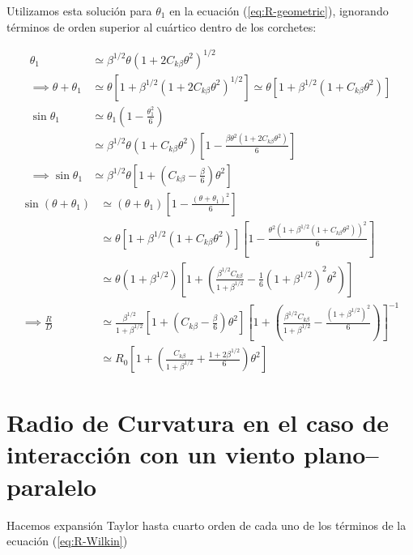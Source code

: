Utilizamos esta solución para $\theta_1$ en la ecuación (\ref{eq:R-geometric}), ignorando términos de orden superior al cuártico
dentro de los corchetes:

\begin{align}
  \theta_1 &\simeq \beta^{1/2}\theta\left(1 + 2C_{k\beta}\theta^2\right)^{1/2} \\
  \implies \theta + \theta_1 &\simeq \theta\left[1 + \beta^{1/2}\left(1 + 2C_{k\beta}\theta^2\right)^{1/2}\right]
  \simeq \theta\left[1 + \beta^{1/2}\left(1 + C_{k\beta}\theta^2\right)\right]\\ 
  \sin\theta_1 &\simeq \theta_1\left(1 - \frac{\theta^2_1}{6}\right) \\
  &\simeq \beta^{1/2}\theta\left(1 + C_{k\beta}\theta^2\right)\left[1 - \frac{\beta\theta^2\left(1 + 2C_{k\beta}\theta^2\right)}{6}\right]\\
  \implies \sin\theta_1 &\simeq \beta^{1/2}\theta\left[1 + \left(C_{k\beta}- \frac{\beta}{6}\right)\theta^2\right]
\end{align}
\begin{align}
  \sin\left(\theta + \theta_1 \right) &\simeq \left(\theta + \theta_1\right)\left[1 - \frac{\left(\theta + \theta_1\right)^2}{6}\right] \\
           &\simeq \theta\left[1 + \beta^{1/2}\left(1 + C_{k\beta}\theta^2\right)\right] \left[1 - \frac{\theta^2\left(1 + \beta^{1/2}
             \left(1 + C_{k\beta}\theta^2\right)\right)^2}{6}\right] \\
           &\simeq \theta\left(1 + \beta^{1/2}\right)\left[1 + \left(\frac{\beta^{1/2}C_{k\beta}}{1 + \beta^{1/2}} - \frac{1}{6}\left(1 + \beta^{1/2}\right)^2
             \theta^2\right)\right]\\
  \implies \frac{R}{D} &\simeq \frac{\beta^{1/2}}{1 + \beta^{1/2}}\left[1 + \left(C_{k\beta} - \frac{\beta}{6}\right)\theta^2\right]
                         \left[1 + \left(\frac{\beta^{1/2}C_{k\beta}}{1 + \beta^{1/2}} - \frac{\left(1 + \beta^{1/2}\right)^2}{6}\right)\right]^{-1} \\
  &\simeq R_0 \left[1 + \left(\frac{C_{k\beta}}{1+\beta^{1/2}} + \frac{1+2\beta^{1/2}}{6}\right)\theta^2\right] 
\end{align}


\section{Radio de Curvatura en el caso de interacción con un viento plano--paralelo}
\label{sec:Rc-Wilkin}
Hacemos expansión Taylor hasta cuarto orden de cada uno de los términos de la ecuación (\ref{eq:R-Wilkin})

